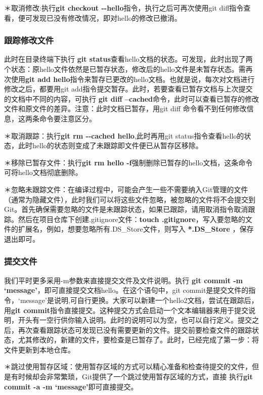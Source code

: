\documentclass{article}
\begin{document}
＊取消修改:执行\textbf{git checkout {-}{-}hello}指令，执行之后可再次使用git diff指令查看，便可发现已没有修改情况，即对hello的修改已撤消。
\subsubsection{跟踪修改文件}
此时在目录终端下执行 \textbf{git status}查看hello文档的状态。可发现，此时出现了两个状态：原hello文件依然是已暂存状态，修改后的hello文件是未暂存状态。需再次使用\textbf{git add hello}指令来暂存已更改的hello文档。也就是说，每次对文档进行修改之后，都要用git add指令提交暂存。此时，若要查看已暂存文档与上次提交的文档中不同的内容，可执行 \textbf{git diff --cached}命令，此时可以查看已暂存的修改文件和原文件的差异。注意：此时文档已暂存，用git diff 命令看不到任何修改信息，这两条命令要注意区分。

＊取消跟踪：执行\textbf{git rm {-}{-}cached hello},此时再用git status指令查看hello的状态，此时hello的状态则变成了未跟踪即文件便已从暂存区移除。

＊移除已暂存文件：执行\textbf{git rm hello -f}强制删除已暂存的hello文档，这条命令可将hello文档彻底删除。

＊忽略未跟踪文件：在编译过程中，可能会产生一些不需要纳入Git管理的文件（通常为隐藏文件），此时我们可以将这些文件忽略，被忽略的文件将不会提交到Git。首先确保需要忽略的文件是未跟踪状态，如果已跟踪，请用取消指令取消跟踪。然后在项目仓库下创建.gitignore文件：\textbf{touch .gitignore}，写入要忽略的文件的扩展名，例如，想要忽略所有.DS\_Store文件，则写入  \textbf{*.DS\_Store }，保存退出即可。

\subsubsection{提交文件}
我们平时更多采用-m参数来直接提交文件及文件说明。执行 \textbf{git commit -m `message'}，即可直接提交文档hello。在这个语句中，git commit是提交文件的指令，`message'是说明,可自行更换。大家可以新建一个hello2文档，尝试在跟踪后，用\textbf{git commit}指令直接提交。这种提交方式会启动一个文本编辑器来用于提交说明，开头有一空行供你输入说明。此时的说明可以为空，也可以自行定义。提交之后，再次查看跟踪状态可发现已没有需要更新的文件。提交前要检查文件的跟踪状态，尤其修改的，新建的文件，要检查是已暂存了。此时，已经完成了第一步：将文件更新到本地仓库。

＊跳过使用暂存区域：使用暂存区域的方式可以精心准备和检查待提交的文件，但是有时候却会非常繁琐，Git提供了一个跳过使用暂存区域的方式，直接 执行\textbf{git commit -a -m `message'}即可直接提交。 
\end{document}
